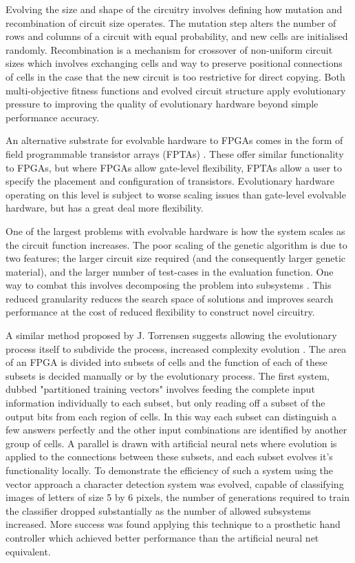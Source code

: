 Evolving the size and shape of the circuitry involves defining how mutation and recombination
of circuit size operates. The mutation step alters the number of rows and columns of a circuit
with equal probability, and new cells are initialised randomly. Recombination is a
mechanism for crossover of non-uniform circuit sizes which involves exchanging cells
and way to preserve positional connections of cells in the case that the new circuit
is too restrictive for direct copying.
Both multi-objective fitness functions and evolved circuit structure
apply evolutionary pressure to improving the quality of evolutionary hardware
beyond simple performance accuracy.

An alternative substrate for evolvable hardware to FPGAs comes in the form of field
programmable transistor arrays (FPTAs) \cite{869347}. These offer similar functionality
to FPGAs, but where FPGAs allow gate-level flexibility, FPTAs allow a user to specify
the placement and configuration of transistors. Evolutionary hardware operating on this
level is subject to worse scaling issues than gate-level evolvable hardware, but has a
great deal more flexibility.

One of the largest problems with evolvable hardware is how the system scales as the
circuit function increases. The poor scaling of the genetic algorithm is due to two
features; the larger circuit size required (and the consequently larger genetic material),
and the larger number of test-cases in the evaluation function. One way to combat this
involves decomposing the problem into subsystems \cite{10.1007/978-3-540-46239-2_5}.
This reduced granularity reduces the search space of solutions and improves search
performance at the cost of reduced flexibility to construct novel circuitry.

A similar method proposed by J. Torrensen suggests allowing the evolutionary
process itself to subdivide the process, increased complexity evolution \cite{Torresen2002}. The area
of an FPGA is divided into subsets of cells and the function of each of these
subsets is decided manually or by the evolutionary process.
The first system, dubbed "partitioned training vectors" involves feeding the
complete input information individually to each subset, but only reading off
a subset of the output bits from each region of cells. In this way each subset
can distinguish a few answers perfectly and the other input combinations are
identified by another group of cells.
A parallel is drawn
with artificial neural nets where evolution is applied to the connections between
these subsets, and each subset evolves it's functionality locally. To demonstrate
the efficiency of such a system using the vector approach a character detection system was evolved, capable
of classifying images of letters of size 5 by 6 pixels, the number of generations
required to train the classifier dropped substantially as the number of allowed subsystems
increased. More success was found applying this technique to a prosthetic hand controller
which achieved better performance than the artificial neural net equivalent.

